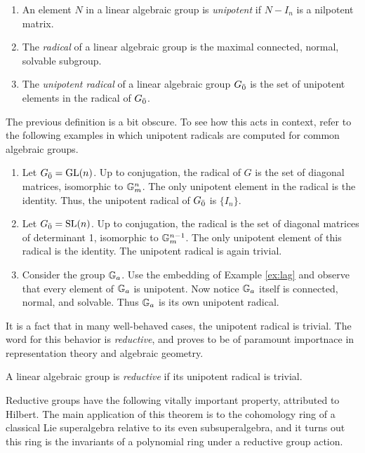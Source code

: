\begin{definition}
  \begin{enumerate}
  \item An element $N$ in a linear algebraic group is \emph{unipotent} if $N- I_n$ is a nilpotent matrix.
  \item The \emph{radical} of a linear algebraic group is the maximal connected, normal, solvable subgroup.
  \item The \emph{unipotent radical} of a linear algebraic group ${G}_{\bar{0}}$ is the set of unipotent elements in the radical of ${G}_{\bar{0}}$.
  \end{enumerate}
\end{definition}
The previous definition is a bit obscure. To see how this acts in context, refer to the following examples in which unipotent radicals are computed for common algebraic groups.
\begin{example}
  \begin{enumerate}
  \item Let ${G}_{\bar{0}} = \operatorname{GL}(n)$. Up to conjugation, the radical of $G$ is the set of diagonal matrices, isomorphic to $\mathbb{G}_m^n$. The only unipotent element in the radical is the identity. Thus, the unipotent radical of ${G}_{\bar{0}}$ is $\{I_n\}$.
  \item Let ${G}_{\bar{0}} = \operatorname{SL}(n)$. Up to conjugation, the radical is the set of diagonal matrices of determinant 1, isomorphic to $\mathbb{G}_m^{n-1}$. The only unipotent element of this radical is the identity. The unipotent radical is again trivial.
  \item Consider the group $\mathbb{G}_a$. Use the embedding of Example \ref{ex:lag} and observe that every element of $\mathbb{G}_a$ is unipotent. Now notice $\mathbb{G}_a$ itself is connected, normal, and solvable. Thus $\mathbb{G}_a$ is its own unipotent radical.
  \end{enumerate}
\end{example}

It is a fact that in many well-behaved cases, the unipotent radical is trivial. The word for this behavior is \emph{reductive}, and proves to be of paramount importnace in representation theory and algebraic geometry.

\begin{definition}
  A linear algebraic group is \emph{reductive} if its unipotent radical is trivial. 
\end{definition}

Reductive groups have the following vitally important property, attributed to Hilbert. The main application of this theorem is to the cohomology ring of a classical Lie superalgebra relative to its even subsuperalgebra, and it turns out this ring is the invariants of a polynomial ring under a reductive group action.

